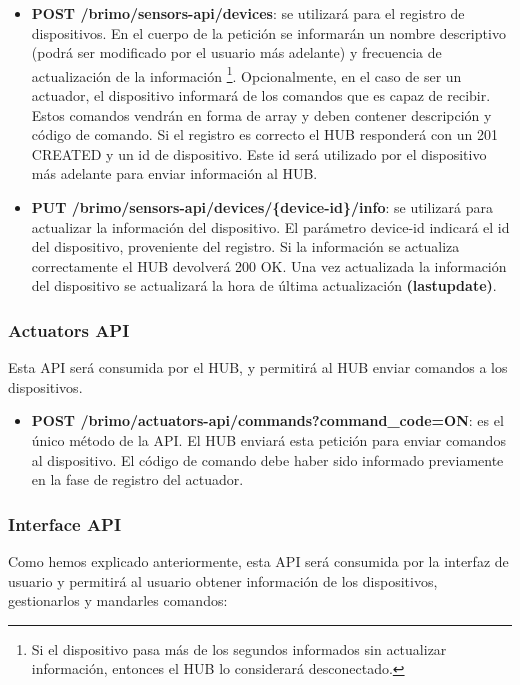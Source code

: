 \begin{itemize}
\item \textbf{POST /brimo/sensors-api/devices}: se utilizará para el registro de dispositivos. En el cuerpo de la petición se informarán
 un nombre descriptivo (podrá ser modificado por el usuario más adelante) y frecuencia
de actualización de la información \footnote{ Si el dispositivo pasa más de los segundos informados sin actualizar información, entonces
el HUB lo considerará desconectado.}. Opcionalmente, en el caso de ser un actuador, el dispositivo informará de los comandos que es capaz
de recibir. Estos comandos vendrán en forma de array y deben contener descripción y código de comando.
Si el registro es correcto el HUB responderá con un 201 CREATED y un id de dispositivo. Este id será utilizado por el dispositivo más adelante
para enviar información al HUB.
\item \textbf{PUT /brimo/sensors-api/devices/\{device-id\}/info}: se utilizará para actualizar la información del dispositivo. El parámetro
device-id indicará el id del dispositivo, proveniente del registro. Si la información se actualiza correctamente el HUB devolverá 200 OK. Una vez
actualizada la información del dispositivo se actualizará la hora de última actualización \textbf{(lastupdate)}.
\end{itemize}

\subsubsection{Actuators API}
Esta API será consumida por el HUB, y permitirá al HUB enviar comandos a los dispositivos.

\begin{itemize}

\item \textbf{POST /brimo/actuators-api/commands?command\_code=ON}: es el único método de la API. El HUB enviará esta petición para enviar
comandos al dispositivo. El código de comando debe haber sido informado previamente en la fase de registro del actuador.

\end{itemize}

\subsubsection{Interface API}
Como hemos explicado anteriormente, esta API será consumida por la interfaz de usuario y permitirá al usuario obtener información de los dispositivos,
gestionarlos y mandarles comandos:

